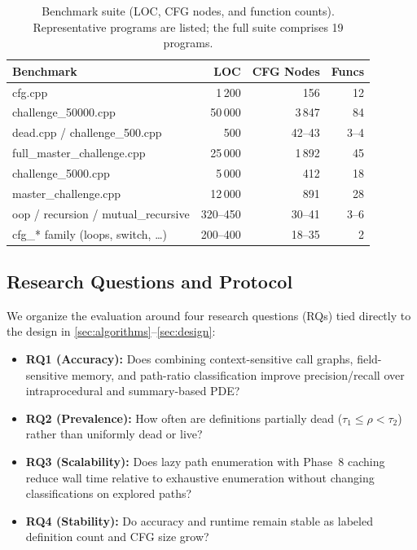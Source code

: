 \documentclass[acmsmall,screen,review,anonymous]{acmart}
\begin{document}
\begin{table}[t]
\centering\footnotesize
\caption{Benchmark suite (LOC, CFG nodes, and function counts). Representative programs are listed; the full suite comprises 19 programs.}
\label{tab:benchmarks}
\begin{tabular}{lrrr}
\toprule
\textbf{Benchmark} & \textbf{LOC} & \textbf{CFG Nodes} & \textbf{Funcs} \\
\midrule
cfg.cpp & 1\,200 & 156 & 12 \\
challenge\_50000.cpp & 50\,000 & 3\,847 & 84 \\
dead.cpp / challenge\_500.cpp & 500 & 42--43 & 3--4 \\
full\_master\_challenge.cpp & 25\,000 & 1\,892 & 45 \\
challenge\_5000.cpp & 5\,000 & 412 & 18 \\
master\_challenge.cpp & 12\,000 & 891 & 28 \\
oop / recursion / mutual\_recursive & 320--450 & 30--41 & 3--6 \\
cfg\_* family (loops, switch, \ldots) & 200--400 & 18--35 & 2 \\
\bottomrule
\end{tabular}
\end{table}

\subsection{Research Questions and Protocol}
We organize the evaluation around four research questions (RQs) tied directly to the design in \autoref{sec:algorithms}--\autoref{sec:design}:
\begin{itemize}[leftmargin=*,itemsep=1pt]
\item \textbf{RQ1 (Accuracy):} Does combining context-sensitive call graphs, field-sensitive memory, and path-ratio classification improve precision/recall over intraprocedural and summary-based PDE?
\item \textbf{RQ2 (Prevalence):} How often are definitions partially dead ($\tau_1\le\rho<\tau_2$) rather than uniformly dead or live?
\item \textbf{RQ3 (Scalability):} Does lazy path enumeration with Phase~8 caching reduce wall time relative to exhaustive enumeration without changing classifications on explored paths?
\item \textbf{RQ4 (Stability):} Do accuracy and runtime remain stable as labeled definition count and CFG size grow?
\end{itemize}
\end{document}
